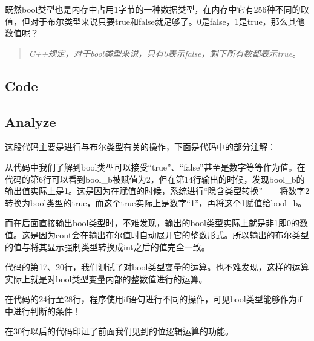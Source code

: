 既然bool类型也是内存中占用1字节的一种数据类型，在内存中它有256种不同的取值，但对于布尔类型来说只要true和false就足够了。0是false，1是true，那么其他数值呢？
\begin{quote}
	\emph{C++规定，对于bool类型来说，只有0表示false，剩下所有数都表示true}。
\end{quote}

\subsection{Code}



\subsection{Analyze}

这段代码主要是进行与布尔类型有关的操作，下面是代码中的部分注解：
\begin{quote}
\showremarks
\end{quote}

从代码中我们了解到bool类型可以接受“true”、“false”甚至是数字等等作为值。在代码的第6行可以看到bool\_b被赋值为2，但在第14行输出的时候，发现bool\_b的输出值实际上是1。这是因为在赋值的时候，系统进行“隐含类型转换”——将数字2转换为bool类型的true，而这个true实际上是数字“1”，再将这个1赋值给bool\_b。

而在后面直接输出bool类型时，不难发现，输出的bool类型实际上就是非1即0的数值。这是因为cout会在输出布尔值时自动展开它的整数形式。所以输出的布尔类型的值与将其显示强制类型转换成int之后的值完全一致。

代码的第17、20行，我们测试了对bool类型变量的运算。也不难发现，这样的运算实际上就是对bool类型变量内部的整数值进行的运算。

在代码的24行至28行，程序使用if语句进行不同的操作，可见bool类型能够作为if中进行判断的条件！

在30行以后的代码印证了前面我们见到的位逻辑运算的功能。

